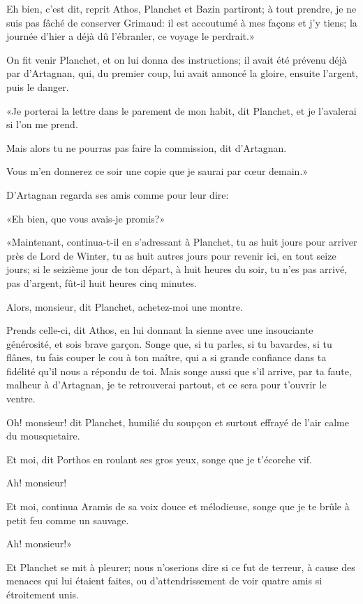 \speak  Eh bien, c'est dit, reprit Athos, Planchet et Bazin partiront; à tout prendre, je ne suis pas fâché de conserver Grimaud: il est accoutumé à mes façons et j'y tiens; la journée d'hier a déjà dû l'ébranler, ce voyage le perdrait.» 

On fit venir Planchet, et on lui donna des instructions; il avait été prévenu déjà par d'Artagnan, qui, du premier coup, lui avait annoncé la gloire, ensuite l'argent, puis le danger. 

«Je porterai la lettre dans le parement de mon habit, dit Planchet, et je l'avalerai si l'on me prend. 

\speak  Mais alors tu ne pourras pas faire la commission, dit d'Artagnan. 

\speak  Vous m'en donnerez ce soir une copie que je saurai par cœur demain.» 

D'Artagnan regarda ses amis comme pour leur dire: 

«Eh bien, que vous avais-je promis?» 

«Maintenant, continua-t-il en s'adressant à Planchet, tu as huit jours pour arriver près de Lord de Winter, tu as huit autres jours pour revenir ici, en tout seize jours; si le seizième jour de ton départ, à huit heures du soir, tu n'es pas arrivé, pas d'argent, fût-il huit heures cinq minutes. 

Alors, monsieur, dit Planchet, achetez-moi une montre. 

Prends celle-ci, dit Athos, en lui donnant la sienne avec une insouciante générosité, et sois brave garçon. Songe que, si tu parles, si tu bavardes, si tu flânes, tu fais couper le cou à ton maître, qui a si grande confiance dans ta fidélité qu'il nous a répondu de toi. Mais songe aussi que s'il arrive, par ta faute, malheur à d'Artagnan, je te retrouverai partout, et ce sera pour t'ouvrir le ventre. 

\speak  Oh! monsieur! dit Planchet, humilié du soupçon et surtout effrayé de l'air calme du mousquetaire. 

\speak  Et moi, dit Porthos en roulant ses gros yeux, songe que je t'écorche vif. 

\speak  Ah! monsieur! 

\speak  Et moi, continua Aramis de sa voix douce et mélodieuse, songe que je te brûle à petit feu comme un sauvage. 

\speak  Ah! monsieur!» 

Et Planchet se mit à pleurer; nous n'oserions dire si ce fut de terreur, à cause des menaces qui lui étaient faites, ou d'attendrissement de voir quatre amis si étroitement unis. 

